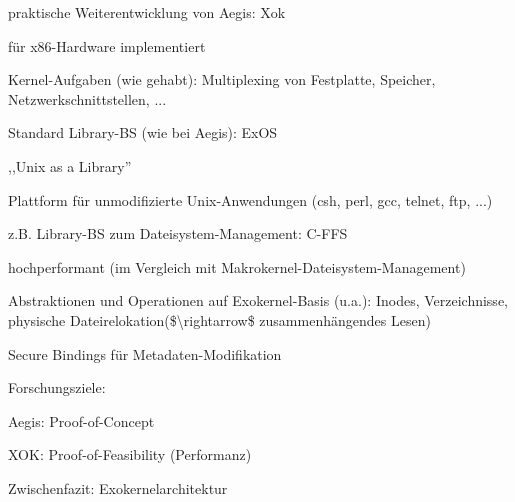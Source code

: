\documentclass[a4paper]{article}
\begin{document}
\begin{multicols}{3}
    \begin{itemize*}
        \item
        praktische Weiterentwicklung von Aegis: Xok
        \item
        für x86-Hardware implementiert
        \item
        Kernel-Aufgaben (wie gehabt): Multiplexing von Festplatte, Speicher,
        Netzwerkschnittstellen, ...
        \item
        Standard Library-BS (wie bei Aegis): ExOS
        \begin{itemize*}
            \item ,,Unix as a Library''
            \item Plattform für unmodifizierte Unix-Anwendungen (csh, perl, gcc, telnet, ftp, ...)
        \end{itemize*}
        \item
        z.B. Library-BS zum Dateisystem-Management: C-FFS
        \begin{itemize*}
            \item hochperformant (im Vergleich mit Makrokernel-Dateisystem-Management)
            \item Abstraktionen und Operationen auf Exokernel-Basis (u.a.): Inodes, Verzeichnisse, physische Dateirelokation(\$\textbackslash rightarrow\$ zusammenhängendes Lesen)
            \item Secure Bindings für Metadaten-Modifikation
        \end{itemize*}
        \item
        Forschungsziele:
        \begin{itemize*}
            \item Aegis: Proof-of-Concept
            \item XOK: Proof-of-Feasibility (Performanz)
        \end{itemize*}
        \item
    \end{itemize*}

    Zwischenfazit: Exokernelarchitektur


\end{multicols}
\end{document}
